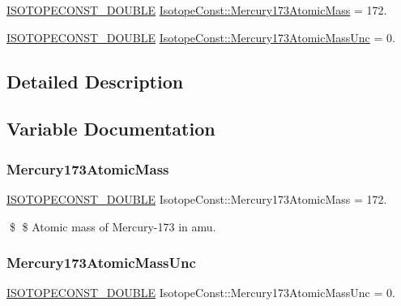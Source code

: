 \begin{DoxyCompactItemize}
\item 
\mbox{\hyperlink{group___isotope_const-_macros_ga8f45a7272ce02c0b4c65c44636ed719a}{I\+S\+O\+T\+O\+P\+E\+C\+O\+N\+S\+T\+\_\+\+D\+O\+U\+B\+LE}} \mbox{\hyperlink{group___isotope_const-_mercury-_hg173_ga674118b61fff5e63abe756c218e3e577}{Isotope\+Const\+::\+Mercury173\+Atomic\+Mass}} = 172.
\item 
\mbox{\hyperlink{group___isotope_const-_macros_ga8f45a7272ce02c0b4c65c44636ed719a}{I\+S\+O\+T\+O\+P\+E\+C\+O\+N\+S\+T\+\_\+\+D\+O\+U\+B\+LE}} \mbox{\hyperlink{group___isotope_const-_mercury-_hg173_ga0bf925b7cd62eabc051eff5fe106c7b8}{Isotope\+Const\+::\+Mercury173\+Atomic\+Mass\+Unc}} = 0.
\end{DoxyCompactItemize}


\subsection{Detailed Description}


\subsection{Variable Documentation}
\mbox{\label{group___isotope_const-_mercury-_hg173_ga674118b61fff5e63abe756c218e3e577}} 
\subsubsection{\texorpdfstring{Mercury173\+Atomic\+Mass}{Mercury173AtomicMass}}
{\footnotesize\ttfamily \mbox{\hyperlink{group___isotope_const-_macros_ga8f45a7272ce02c0b4c65c44636ed719a}{I\+S\+O\+T\+O\+P\+E\+C\+O\+N\+S\+T\+\_\+\+D\+O\+U\+B\+LE}} Isotope\+Const\+::\+Mercury173\+Atomic\+Mass = 172.}

\$ \$ Atomic mass of Mercury-\/173 in amu. \mbox{\label{group___isotope_const-_mercury-_hg173_ga0bf925b7cd62eabc051eff5fe106c7b8}} 
\subsubsection{\texorpdfstring{Mercury173\+Atomic\+Mass\+Unc}{Mercury173AtomicMassUnc}}
{\footnotesize\ttfamily \mbox{\hyperlink{group___isotope_const-_macros_ga8f45a7272ce02c0b4c65c44636ed719a}{I\+S\+O\+T\+O\+P\+E\+C\+O\+N\+S\+T\+\_\+\+D\+O\+U\+B\+LE}} Isotope\+Const\+::\+Mercury173\+Atomic\+Mass\+Unc = 0.}

